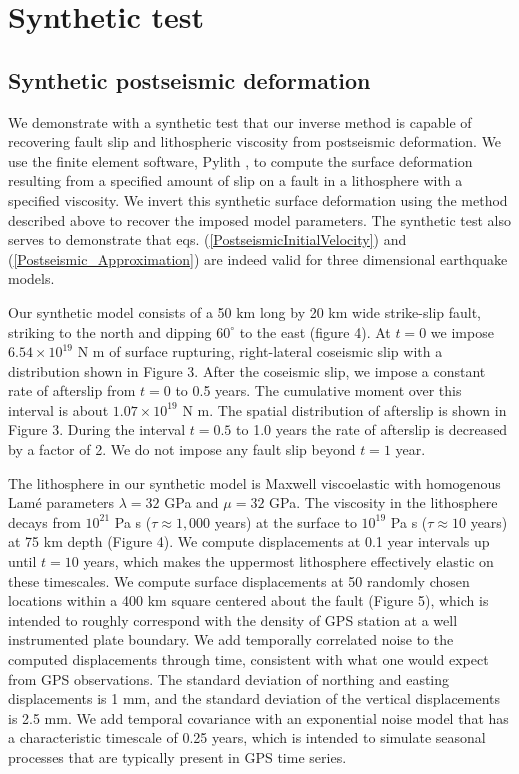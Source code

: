 \documentclass[extra]{gji}
\begin{document}
\section{Synthetic test}
\subsection{Synthetic postseismic deformation}

We demonstrate with a synthetic test that our inverse method is
capable of recovering fault slip and lithospheric viscosity from
postseismic deformation.  We use the finite element software, Pylith
\citep{A2007}, to compute the surface deformation resulting from a
specified amount of slip on a fault in a lithosphere with a specified
viscosity.  We invert this synthetic surface deformation using the
method described above to recover the imposed model parameters.  The
synthetic test also serves to demonstrate that
eqs. (\ref{PostseismicInitialVelocity}) and
(\ref{Postseismic_Approximation}) are indeed valid for three
dimensional earthquake models.

Our synthetic model consists of a 50 km long by 20 km wide strike-slip
fault, striking to the north and dipping $60^{\circ}$ to the east (figure
4). At $t=0$ we impose $6.54\times 10^{19}$ N m of surface rupturing,
right-lateral coseismic slip with a distribution shown in Figure 3.
After the coseismic slip, we impose a constant rate of afterslip from
$t=0$ to 0.5 years.  The cumulative moment over this
interval is about $1.07\times 10^{19}$ N m.  The spatial distribution of
afterslip is shown in Figure 3.  During the interval $t=0.5$ to
1.0 years the rate of afterslip is decreased by a factor of 2.
We do not impose any fault slip beyond $t=1$ year.

The lithosphere in our synthetic model is Maxwell viscoelastic with
homogenous Lam\'e parameters $\lambda = 32$ GPa and $\mu = 32$
GPa.  The viscosity in the lithosphere decays from $10^{21}$ Pa s
($\tau\approx1,000$ years) at the surface to $10^{19}$ Pa s
($\tau\approx10$ years) at 75 km depth (Figure 4).  We compute
displacements at 0.1 year intervals up until $t=10$ years, which makes
the uppermost lithosphere effectively elastic on these timescales. We compute
surface displacements at 50 randomly chosen locations within a 400 km
square centered about the fault (Figure 5), which is intended to
roughly correspond with the density of GPS station at a well
instrumented plate boundary.  We add temporally correlated noise to
the computed displacements through time, consistent with what one would
expect from GPS observations.  The standard deviation of northing and
easting displacements is 1 mm, and the standard deviation of the
vertical displacements is 2.5 mm.  We add temporal covariance with an
exponential noise model that has a characteristic timescale of 0.25
years, which is intended to simulate seasonal processes that are
typically present in GPS time series.
\end{document}
